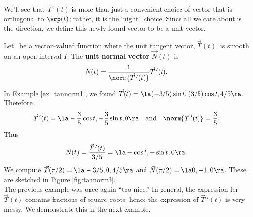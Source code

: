 We'll see that $\vec T\,'(t)$ is more than just a convenient choice of vector that is orthogonal to $\vrp(t)$; rather, it is the ``right'' choice. Since all we care about is the direction, we define this newly found vector to be a unit vector.

{Let \vrt\ be a vector--valued function where the unit tangent vector, $\vec T(t)$, is smooth on an open interval $I$. The \textbf{unit normal vector} $\vec N(t)$ is
\[
\vec N(t) = \frac1{\norm{\vec T\,'(t)}}\vec T\,'(t).
\]
}

\pagebreak

{In Example \ref{ex_tannorm1}, we found $\vec T(t) = \la \rule{0pt}{10pt} (-3/5)\sin t,(3/5)\cos t,4/5\ra$. Therefore 
\[
\vec T\,'(t) = \la -\frac35\cos t,-\frac35\sin t,0\ra\quad \text{and} \quad \norm{\vec T\,'(t)} = \frac35.
\]
Thus 
\[
\vec N(t) = \frac{\vec T\,'(t)}{3/5} = \la -\cos t,-\sin t,0\ra.
\]
We compute $\vec T(\pi/2) = \la -3/5,0,4/5\ra$ and $\vec N(\pi/2) = \la 0,-1,0\ra$. These are sketched in Figure \ref{fig:tannorm3}.
}\\

The previous example was once again ``too nice.'' In general, the expression for $\vec T(t)$ contains fractions of square--roots, hence the expression of $\vec T\,'(t)$ is very messy. We demonstrate this in the next example.\\

